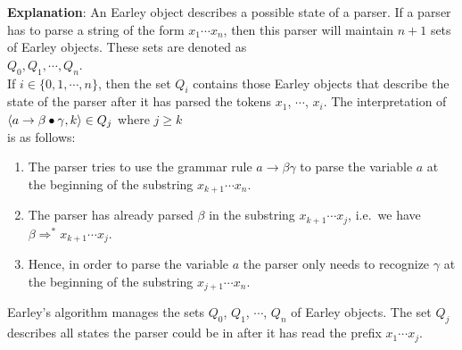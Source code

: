 \noindent
\textbf{Explanation}:
An Earley object describes a possible state of a parser.
If a parser has to parse a string of the form $x_1 \cdots x_n$, then this parser will maintain
$n+1$ sets of Earley objects.  These sets are denoted as
\\[0.2cm]
\hspace*{1.3cm}
$Q_0, Q_1, \cdots, Q_n$.
\\[0.2cm]
If $i \in \{0,1, \cdots, n\}$, then the set $Q_i$ contains those Earley objects that describe the state of
the parser after it has parsed the tokens $x_1$, $\cdots$, $x_i$.  
The interpretation of 
\\[0.2cm]
\hspace*{1.3cm}
$\langle a \rightarrow \beta \mdot \gamma, k \rangle \in Q_j$ \quad where  $j \geq k$
\\[0.2cm]
is as follows:
\begin{enumerate}
\item The parser tries to use the grammar rule $a \rightarrow \beta \gamma$ to parse the variable $a$ at the
      beginning of the substring $x_{k+1} \cdots x_n$.
\item The parser has already parsed $\beta$ in the substring  $x_{k+1} \cdots x_j$, i.e.~we have
      \\[0.2cm]
      \hspace*{1.3cm}
      $\beta \Rightarrow^* x_{k+1} \cdots x_j$.
\item Hence, in order to parse the variable $a$ the parser only needs to recognize $\gamma$ at the beginning of
      the substring $x_{j+1} \cdots x_n$.
\end{enumerate}
Earley's  algorithm manages the sets $Q_0$, $Q_1$, $\cdots$, $Q_n$  of Earley objects.  The set $Q_j$ describes
all states the parser could be in after it has read the prefix $x_1 \cdots x_j$.


